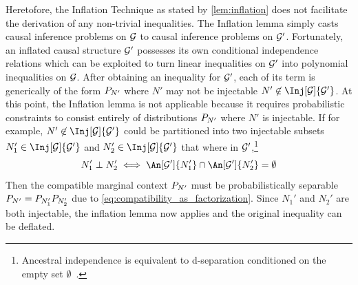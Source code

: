 \documentclass[aps, 10pt, english, twoside, pra, nofootinbib, tightenlines, longbibliography, superscriptaddress]{revtex4-1}
\begin{document}
    Heretofore, the Inflation Technique as stated by \cref{lem:inflation} does not facilitate the derivation of any non-trivial inequalities. The Inflation lemma simply casts causal inference problems on $\mathcal{G}$ to causal inference problems on $\mathcal{G}'$. Fortunately, an inflated causal structure $\mathcal{G}'$ possesses its own conditional independence relations which can be exploited to turn linear inequalities on $\mathcal{G}'$ into polynomial inequalities on $\mathcal{G}$. After obtaining an inequality for $\mathcal{G}'$, each of its term is generically of the form $\prob[N']$ where $N'$ may not be injectable $N' \not \in \Inj[\graph]{\graph'}$. At this point, the Inflation lemma is not applicable because it requires probabilistic constraints to consist entirely of distributions $\prob[N']$ where $N'$ is injectable. If for example, $N' \not \in \Inj[\graph]{\graph'}$ could be partitioned into two injectable subsets $N_1' \in \Inj[\graph]{\graph'}$ and $N_2' \in \Inj[\graph]{\graph'}$ that where  in $\mathcal{G}'$,\footnote{Ancestral independence is equivalent to d-separation conditioned on the empty set $\emptyset$~\cite{Pearl_2009}.}
    \[ N_1' \ancestralindep N_2' \iff \An[\graph']{N_1'} \cap \An[\graph']{N_2'}= \emptyset \]
    Then the compatible marginal context $\prob[N']$ must be probabilistically separable $\prob[N'] = \prob[N_1']\prob[N_2']$ due to \cref{eq:compatibility_as_factorization}. Since $N_1'$ and $N_2'$ are both injectable, the inflation lemma now applies and the original inequality can be deflated.

    \begin{center}
    \end{center}
\end{document}

